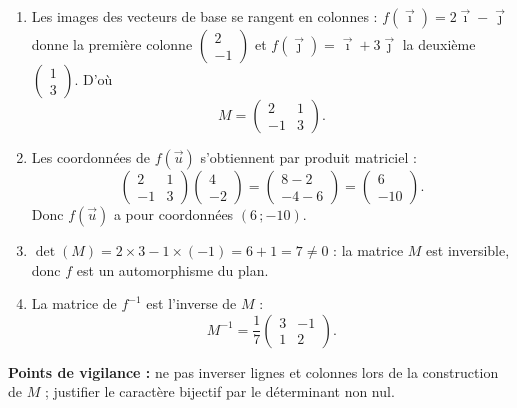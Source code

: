 \documentclass[11pt]{article}
\newcommand{\cle}[1]{{\popxbold\color{popdark}#1}}
\begin{document}
\begin{corrige}
\begin{enumerate}
\item Les images des vecteurs de base se rangent en colonnes : $f(\vec{\imath})=2\vec{\imath}-\vec{\jmath}$ donne la première colonne $\begin{pmatrix} 2 \\ -1 \end{pmatrix}$ et $f(\vec{\jmath})=\vec{\imath}+3\vec{\jmath}$ la deuxième $\begin{pmatrix} 1 \\ 3 \end{pmatrix}$. D'où
\[ M=\begin{pmatrix} 2 & 1 \\ -1 & 3 \end{pmatrix}. \]

\item Les coordonnées de $f(\vec{u})$ s'obtiennent par produit matriciel :
\[ \begin{pmatrix} 2 & 1 \\ -1 & 3 \end{pmatrix}\begin{pmatrix} 4 \\ -2 \end{pmatrix}=\begin{pmatrix} 8-2 \\ -4-6 \end{pmatrix}=\begin{pmatrix} 6 \\ -10 \end{pmatrix}. \]
Donc $f(\vec{u})$ a pour coordonnées $(6\,;-10)$.

\item $\det(M)=2\times3-1\times(-1)=6+1=7\neq0$ : la matrice $M$ est inversible, donc $f$ est un \cle{automorphisme} du plan.

\item La matrice de $f^{-1}$ est l'inverse de $M$ :
\[ M^{-1}=\frac{1}{7}\begin{pmatrix} 3 & -1 \\ 1 & 2 \end{pmatrix}. \]
\end{enumerate}
\textbf{Points de vigilance :} ne pas inverser lignes et colonnes lors de la construction de $M$ ; justifier le caractère bijectif par le déterminant non nul.
\end{corrige}
\end{document}
